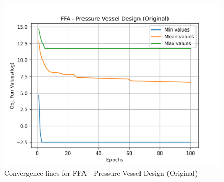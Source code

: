 \begin{figure}[H]
        \centering
        \caption{Convergence lines for FFA - Pressure Vessel Design (Original)}
        \label{fig:pressure_vessel_problem_original_solve_ffa}
        \includegraphics[scale=0.5]{images/pressure_vessel_problem_original_solve_ffa.png}
        \end{figure}
        